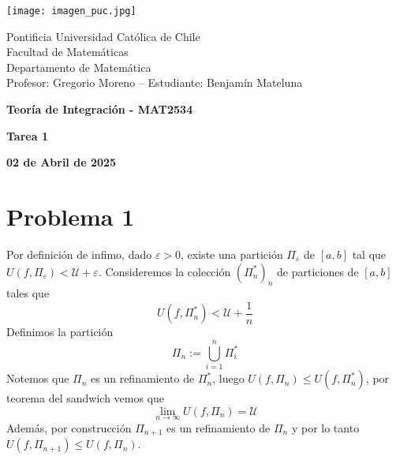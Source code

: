 \documentclass{article}
\begin{document}
\begin{minipage}{2.5cm}
    \texttt{[image: imagen\_puc.jpg]}
\end{minipage}
\begin{minipage}{14cm}
    {\sc Pontificia Universidad Católica de Chile\\
    Facultad de Matemáticas\\
    Departamento de Matemática\\
    Profesor: Gregorio Moreno -- Estudiante: Benjamín Mateluna}
\end{minipage}
\vspace{1ex}

{\centerline{\bf Teoría de Integración - MAT2534}
\centerline{\bf Tarea 1}}
\centerline{\bf 02 de Abril de 2025}

\section*{Problema 1}
\noindent Por definición de infimo, dado $\varepsilon>0$, existe una partición $\Pi_{\varepsilon}$ 
de $[a,b]$ tal que $U(f,\Pi_{\varepsilon})<\mathcal{U}+\varepsilon$. Consideremos la colección
$\left(\Pi^{*}_{n}\right)_{n}$ de particiones de $[a,b]$ tales que
\begin{equation*}
    U(f,\Pi^{*}_{n})<\mathcal{U}+\frac{1}{n}
\end{equation*}
Definimos la partición
\begin{equation*}
    \Pi_{n}:=\bigcup_{i=1}^{n}\Pi^{*}_{i}
\end{equation*}
Notemos que $\Pi_{n}$ es un refinamiento de $\Pi^{*}_{n}$, luego $U(f,\Pi_{n})\leq 
U(f,\Pi^{*}_{n})$, por teorema del sandwich vemos que
\begin{equation*}
    \lim_{n\to\infty}U(f,\Pi_{n})=\mathcal{U}
\end{equation*}
Además, por construcción $\Pi_{n+1}$ es un refinamiento de $\Pi_{n}$ y por lo tanto $U(f,\Pi_{n+1})
\leq U(f,\Pi_{n})$.
\end{document}
